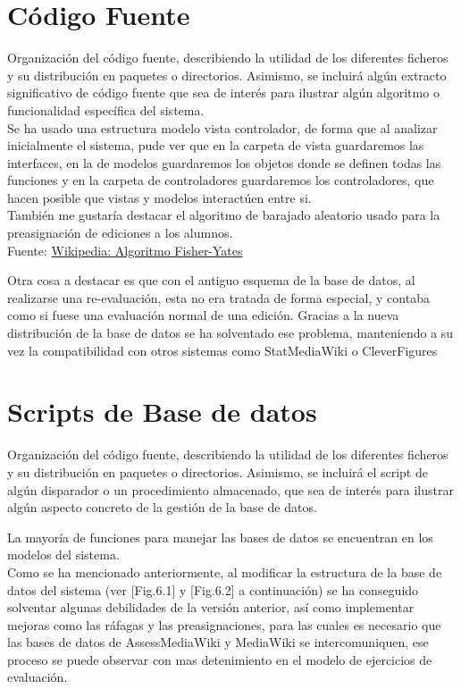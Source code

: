 \section{Código Fuente}
Organización del código fuente, describiendo la utilidad de los diferentes ficheros y su distribución en paquetes o directorios. Asimismo, se incluirá algún extracto significativo de código fuente que sea de interés para ilustrar algún algoritmo o funcionalidad específica del sistema.\\

Se ha usado una estructura modelo vista controlador, de forma que al analizar inicialmente el sistema, pude ver que en la carpeta de vista guardaremos las interfaces, en la de modelos guardaremos los objetos donde se definen todas las funciones y en la carpeta de controladores guardaremos los controladores, que hacen posible que vistas y modelos interactúen entre si.\\

También me gustaría destacar el algoritmo de barajado aleatorio usado para la preasignación de ediciones a los alumnos.\\
Fuente: 
\href{https://es.wikipedia.org/wiki/Algoritmo_Fisher-Yates}{Wikipedia: Algoritmo Fisher-Yates}

Otra cosa a destacar es que con el antiguo esquema de la base de datos, al realizarse una re-evaluación, esta no era tratada de forma especial, y contaba como si fuese una evaluación normal de una edición.
Gracias a la nueva distribución de la base de datos se ha solventado ese problema, manteniendo a su vez la compatibilidad con otros sistemas como StatMediaWiki o CleverFigures

\section{Scripts de Base de datos}
Organización del código fuente, describiendo la utilidad de los diferentes ficheros y su distribución en paquetes o directorios. Asimismo, se incluirá el script de algún disparador o un procedimiento almacenado, que sea de interés para ilustrar algún aspecto concreto de la gestión de la base de datos.

La mayoría de funciones para manejar las bases de datos se encuentran en los modelos del sistema.\\

Como se ha mencionado anteriormente, al modificar la estructura de la base de datos del sistema (ver [Fig.6.1] y [Fig.6.2] a continuación) se ha conseguido solventar algunas debilidades de la versión anterior, así como implementar mejoras como las ráfagas y las preasignaciones, para las cuales es necesario que las bases de datos de AssessMediaWiki y MediaWiki se intercomuniquen, ese proceso se puede observar con mas detenimiento en el modelo de ejercicios de evaluación.

